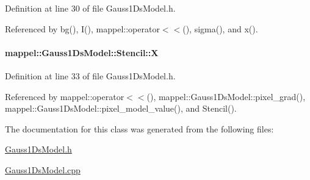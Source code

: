 Definition at line 30 of file Gauss1\+Ds\+Model.\+h.



Referenced by bg(), I(), mappel\+::operator$<$$<$(), sigma(), and x().

\paragraph[{\texorpdfstring{X}{X}}]{ mappel\+::\+Gauss1\+Ds\+Model\+::\+Stencil\+::X}\hypertarget{classmappel_1_1Gauss1DsModel_1_1Stencil_aecf000ca64a08c81d6d576500ff37026}{}\label{classmappel_1_1Gauss1DsModel_1_1Stencil_aecf000ca64a08c81d6d576500ff37026}


Definition at line 33 of file Gauss1\+Ds\+Model.\+h.



Referenced by mappel\+::operator$<$$<$(), mappel\+::\+Gauss1\+Ds\+Model\+::pixel\+\_\+grad(), mappel\+::\+Gauss1\+Ds\+Model\+::pixel\+\_\+model\+\_\+value(), and Stencil().



The documentation for this class was generated from the following files\+:\begin{DoxyCompactItemize}
\item 
\hyperlink{Gauss1DsModel_8h}{Gauss1\+Ds\+Model.\+h}\item 
\hyperlink{Gauss1DsModel_8cpp}{Gauss1\+Ds\+Model.\+cpp}\end{DoxyCompactItemize}

